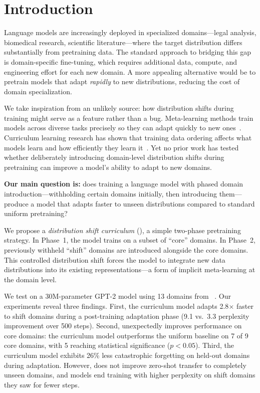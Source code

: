 \section{Introduction}
\label{sec:intro}

Language models are increasingly deployed in specialized domains---legal analysis, biomedical research, scientific literature---where the target distribution differs substantially from pretraining data. The standard approach to bridging this gap is domain-specific fine-tuning, which requires additional data, compute, and engineering effort for each new domain. A more appealing alternative would be to pretrain models that adapt \emph{rapidly} to new distributions, reducing the cost of domain specialization.

We take inspiration from an unlikely source: how distribution shifts during training might serve as a feature rather than a bug. Meta-learning methods train models across diverse tasks precisely so they can adapt quickly to new ones~\cite{finn2017maml}. Curriculum learning research has shown that training data ordering affects what models learn and how efficiently they learn it~\cite{bengio2009curriculum, fan2023irreducible, chen2023skillit}. Yet no prior work has tested whether deliberately introducing domain-level distribution shifts during pretraining can improve a model's ability to adapt to new domains.

{\bf Our main question is:} does training a language model with phased domain introduction---withholding certain domains initially, then introducing them---produce a model that adapts faster to unseen distributions compared to standard uniform pretraining?

We propose a \emph{distribution shift curriculum} (\dsc), a simple two-phase pretraining strategy. In Phase~1, the model trains on a subset of ``core'' domains. In Phase~2, previously withheld ``shift'' domains are introduced alongside the core domains. This controlled distribution shift forces the model to integrate new data distributions into its existing representations---a form of implicit meta-learning at the domain level.

We test \dsc on a 30M-parameter GPT-2 model using 13 domains from \thepile~\cite{gao2020pile}. Our experiments reveal three findings. First, the curriculum model adapts 2.8$\times$ faster to shift domains during a post-training adaptation phase (9.1 vs.\ 3.3 perplexity improvement over 500 steps). Second, \dsc unexpectedly improves performance on core domains: the curriculum model outperforms the uniform baseline on 7 of 9 core domains, with 5 reaching statistical significance ($p < 0.05$). Third, the curriculum model exhibits 26\% less catastrophic forgetting on held-out domains during adaptation. However, \dsc does not improve zero-shot transfer to completely unseen domains, and models end training with higher perplexity on shift domains they saw for fewer steps.

